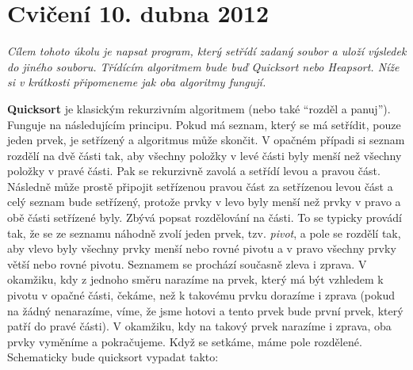 \documentclass[a4paper,10pt,oneside]{amsart}
\theoremstyle{definition}
\begin{document}
\title{}



\thispagestyle{empty}
\section*{Cvičení 10. dubna 2012}
\parindent=0cm

{\it 
Cílem tohoto úkolu je napsat program, který setřídí zadaný soubor a uloží výsledek do jiného souboru.
Třídícím algoritmem bude buď Quicksort nebo Heapsort. Níže si v krátkosti připomeneme jak oba algoritmy
fungují.}

\medskip

{\bf Quicksort} je klasickým rekurzivním algoritmem (nebo také ``rozděl a panuj''). Funguje na
následujícím principu. Pokud má seznam, který se má setřídit, pouze jeden prvek, je setřízený a algoritmus
může skončit. V opačném případi si seznam rozdělí na dvě části tak, aby všechny položky v levé části byly 
menší než všechny položky v pravé části. Pak se rekurzivně zavolá a setřídí
levou a pravou část. Následně může prostě připojit setřízenou pravou část za setřízenou levou část
a celý seznam bude setřízený, protože prvky v levo byly menší než prvky v pravo a obě části setřízené
byly. Zbývá popsat rozdělování na části. To se typicky provádí tak, že se ze seznamu náhodně zvolí jeden
prvek, tzv. \emph{pivot}, a pole se rozdělí tak, aby vlevo byly všechny prvky menší nebo rovné pivotu
a v pravo všechny prvky větší nebo rovné pivotu. Seznamem se prochází současně zleva i zprava. V okamžiku, kdy z 
jednoho směru narazíme na prvek, který má být vzhledem k pivotu v opačné části, čekáme, než k takovému
prvku dorazíme i zprava (pokud na žádný nenarazíme, víme, že jsme hotovi a tento prvek bude první prvek,
který patří do pravé části). V okamžiku, kdy na takový prvek narazíme i zprava, oba prvky vyměníme
a pokračujeme. Když se setkáme, máme pole rozdělené. Schematicky bude quicksort vypadat takto:
\end{document}
